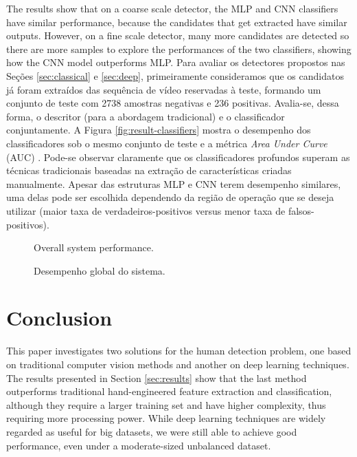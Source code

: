     The results show that on a coarse scale detector, the MLP and CNN classifiers have similar performance, because the candidates that get extracted have similar outputs. However, on a fine scale detector, many more candidates are detected so there are more samples to explore the performances of the two classifiers, showing how the CNN model outperforms MLP.
    Para avaliar os detectores propostos nas Seções \ref{sec:classical} e \ref{sec:deep}, primeiramente consideramos que os candidatos já foram extraídos das sequência de vídeo reservadas à teste, formando um conjunto de teste com 2738 amostras negativas e 236 positivas. Avalia-se, dessa forma, o descritor (para a abordagem tradicional) e o classificador conjuntamente. A Figura \ref{fig:result-classifiers} mostra o desempenho dos classificadores sob o mesmo conjunto de teste e a métrica \textit{Area Under Curve} (AUC) \cite{evaluationMetrics}. Pode-se observar claramente que os classificadores profundos superam as técnicas tradicionais baseadas na extração de características criadas manualmente. Apesar das estruturas MLP e CNN terem desempenho similares, uma delas pode ser escolhida dependendo da região de operação que se deseja utilizar (maior taxa de verdadeiros-positivos versus menor taxa de falsos-positivos).
    \begin{figure*}[!t]
    \vspace{-3ex}
    \centering
    \hfil
    \caption{Overall system performance.}
    \label{fig:result-system-all-zoom}
    \caption{Desempenho global do sistema.}
    \label{fig:result-system}
    \end{figure*}

\section{Conclusion}
    This paper investigates two solutions for the human detection problem, one based on traditional computer vision methods and another on deep learning techniques. The results presented in Section \ref{sec:results} show that the last method outperforms traditional hand-engineered feature extraction and classification, although they require a larger training set and have higher complexity, thus requiring more processing power. While deep learning techniques are widely regarded as useful for big datasets, we were still able to achieve good performance, even under a moderate-sized unbalanced dataset.

